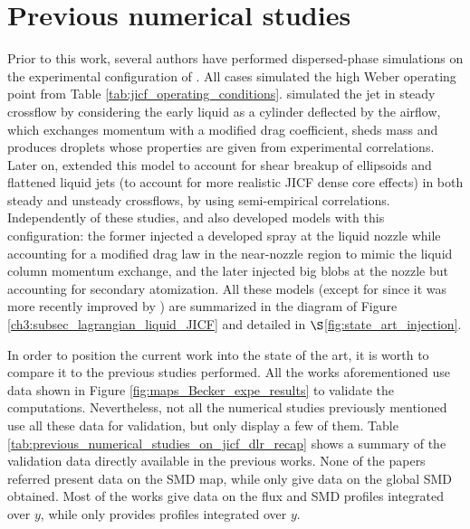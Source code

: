 
%

\section{Previous numerical studies}
\label{ch6:previous_numerical_studies}

Prior to this work, several authors have performed dispersed-phase simulations on the experimental configuration of . All cases simulated the high Weber operating point from Table \ref{tab:jicf_operating_conditions}.  simulated the jet in steady crossflow by considering the early liquid as a cylinder deflected by the airflow, which exchanges momentum with a modified drag coefficient, sheds mass and produces droplets whose properties are given from experimental correlations. Later on,  extended this model to account for shear breakup of ellipsoids and flattened liquid jets (to account for more realistic JICF dense core effects) in both steady and unsteady crossflows, by using semi-empirical correlations. Independently of these studies,  and  also developed models with this configuration: the former injected a developed spray at the liquid nozzle while accounting for a modified drag law in the near-nozzle region to mimic the liquid column momentum exchange, and the later injected big blobs at the nozzle but accounting for secondary atomization. All these models (except for
 since it was more recently improved by ) are summarized in the diagram of Figure \ref{ch3:subsec_lagrangian_liquid_JICF} and detailed in $\S$\ref{fig:state_art_injection}.

In order to position the current work into the state of the art, it is worth to compare it to the previous studies performed. All the works aforementioned use data shown in Figure \ref{fig:maps_Becker_expe_results} to validate the computations. Nevertheless, not all the numerical studies previously mentioned use all these data for validation, but only display a few of them. Table \ref{tab:previous_numerical_studies_on_jicf_dlr_recap} shows a summary of the validation data directly available in the previous works. None of the papers referred present data on the SMD map, while only  give data on the global SMD obtained. Most of the works give data on the flux and SMD profiles integrated over $y$, while only  provides profiles integrated over $y$. %

